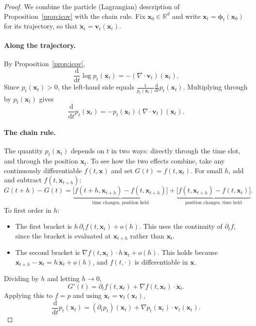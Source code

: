 \documentclass[11pt,a4paper]{article}
\numberwithin{equation}{section}     %
\theoremstyle{plain}        %
\theoremstyle{definition}   %
\theoremstyle{remark}       %
\begin{document}
\begin{proof}
We combine the particle (Lagrangian) description of Proposition~\ref{prop:icov} with the chain rule. Fix $\mathbf{x}_0\in\mathbb{R}^d$ and write $\mathbf{x}_t=\boldsymbol{\phi}_t(\mathbf{x}_0)$ for its trajectory, so that $\dot{\mathbf{x}}_t=\mathbf{v}_t(\mathbf{x}_t)$.

\paragraph{Along the trajectory.} By Proposition~\ref{prop:icov},
\[
\frac{\mathrm{d}}{\mathrm{d}t}\log p_t(\mathbf{x}_t) = -\left(\nabla\cdot\mathbf{v}_t\right)(\mathbf{x}_t).
\]
Since $p_t(\mathbf{x}_t)>0$, the left-hand side equals $\frac{1}{p_t(\mathbf{x}_t)}\frac{\mathrm{d}}{\mathrm{d}t}p_t(\mathbf{x}_t)$. Multiplying through by $p_t(\mathbf{x}_t)$ gives
\begin{equation}\label{eq:ce-lagr}
\frac{\mathrm{d}}{\mathrm{d}t}p_t(\mathbf{x}_t) = -p_t(\mathbf{x}_t)\left(\nabla\cdot\mathbf{v}_t\right)(\mathbf{x}_t).
\end{equation}

\paragraph{The chain rule.} The quantity $p_t(\mathbf{x}_t)$ depends on $t$ in two ways: directly through the time slot, and through the position $\mathbf{x}_t$. To see how the two effects combine, take any continuously differentiable $f(t,\mathbf{x})$ and set $G(t)=f(t,\mathbf{x}_t)$. For small $h$, add and subtract $f(t,\mathbf{x}_{t+h})$:
\[
G(t+h)-G(t)
= \underbrace{\big[f(t+h,\mathbf{x}_{t+h})-f(t,\mathbf{x}_{t+h})\big]}_{\text{time changes, position held}}
+ \underbrace{\big[f(t,\mathbf{x}_{t+h})-f(t,\mathbf{x}_t)\big]}_{\text{position changes, time held}} .
\]
To first order in $h$:
\begin{itemize}
\item The first bracket is $h\,\partial_t f(t,\mathbf{x}_t)+o(h)$. This uses the continuity of $\partial_t f$, since the bracket is evaluated at $\mathbf{x}_{t+h}$ rather than $\mathbf{x}_t$.
\item The second bracket is $\nabla f(t,\mathbf{x}_t)\cdot h\,\dot{\mathbf{x}}_t+o(h)$. This holds because $\mathbf{x}_{t+h}-\mathbf{x}_t=h\,\dot{\mathbf{x}}_t+o(h)$, and $f(t,\cdot)$ is differentiable in $\mathbf{x}$.
\end{itemize}
Dividing by $h$ and letting $h\to0$,
\[
G'(t) = \partial_t f(t,\mathbf{x}_t) + \nabla f(t,\mathbf{x}_t)\cdot\dot{\mathbf{x}}_t .
\]
Applying this to $f=p$ and using $\dot{\mathbf{x}}_t=\mathbf{v}_t(\mathbf{x}_t)$,
\begin{equation}\label{eq:ce-chain}
\frac{\mathrm{d}}{\mathrm{d}t}p_t(\mathbf{x}_t) = \left(\partial_t p_t\right)(\mathbf{x}_t) + \nabla p_t(\mathbf{x}_t)\cdot\mathbf{v}_t(\mathbf{x}_t).
\end{equation}


\end{proof}
\end{document}
